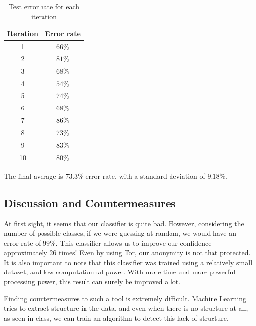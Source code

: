 \documentclass[10pt,conference,compsocconf]{IEEEtran}
\begin{document}
\begin{table}
    \centering
    \begin{tabular}{|c|c|}
        \hline
        Iteration & Error rate      \\
        \hline
        1      & $66\%$  \\
        \hline
        2      & $81\%$  \\
        \hline
        3      & $68\%$  \\
        \hline
        4      & $54\%$  \\
        \hline 
        5      & $74\%$  \\
        \hline
        6      & $68\%$  \\
        \hline 
        7      & $86\%$  \\
        \hline
        8      & $73\%$  \\
        \hline 
        9      & $83\%$  \\
        \hline
        10      & $80\%$  \\
        \hline      
    \end{tabular}
    \caption{Test error rate for each iteration}
    \label{test_error}
\end{table}

The final average is $73.3\%$ error rate, with a standard deviation of $9.18\%$.

\subsection{Discussion and Countermeasures}
At first sight, it seems that our classifier is quite bad. However, considering the number of possible classes, if we were guessing at random, we would have an error rate of $99\%$. This classifier allows us to improve our confidence approximately 26 times! Even by using Tor, our anonymity is not that protected. It is also important to note that this classifier was trained using a relatively small dataset, and low computationnal power. With more time and more powerful processing power, this result can surely be improved a lot.

Finding countermeasures to such a tool is extremely difficult. Machine Learning tries to extract structure in the data, and even when there is no structure at all, as seen in class, we can train an algorithm to detect this lack of structure. 




\clearpage
\end{document}
